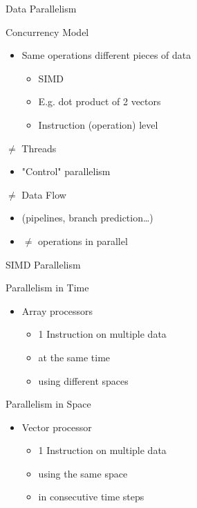 \documentclass[presentation]{beamer}
\begin{document}
\begin{frame}[label={sec:orgf718051}]{Data Parallelism}
\begin{block}{Concurrency Model}
\begin{itemize}
\item \alert{Same} operations \alert{different} pieces of data
\begin{itemize}
\item \alert{SIMD}
\item E.g. dot product of 2 vectors
\item Instruction (operation) level
\end{itemize}
\end{itemize}
\pause
\end{block}
\begin{block}{\(\neq\) Threads}
\begin{itemize}
\item "Control" parallelism
\end{itemize}
\pause
\end{block}
\begin{block}{\(\neq\) Data Flow}
\begin{itemize}
\item (pipelines, branch prediction\ldots{})
\item \(\neq\) operations in parallel
\end{itemize}
\end{block}
\end{frame}


\begin{frame}[label={sec:org53f5036}]{SIMD Parallelism}
\begin{block}{Parallelism in \alert{Time}}
\begin{itemize}
\item \alert{Array} processors
\begin{itemize}
\item 1 Instruction on multiple data
\item at the \alert{same time}
\item using \alert{different spaces}
\end{itemize}
\end{itemize}
\pause
\end{block}
\begin{block}{Parallelism in \alert{Space}}
\begin{itemize}
\item \alert{Vector} processor
\begin{itemize}
\item 1 Instruction on multiple data
\item using the \alert{same space}
\item in \alert{consecutive time steps}
\end{itemize}
\end{itemize}
\end{block}
\end{frame}
\end{document}
